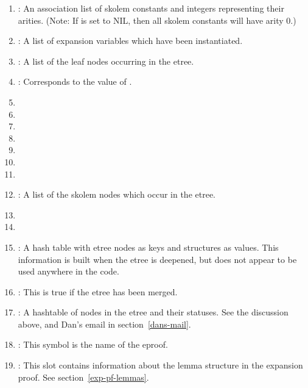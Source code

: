 \begin{enumerate}
\item {}:  An association list of skolem constants and integers representing their arities.
(Note: If  is set to NIL, then all skolem constants will have arity 0.)

\item {}:  A list of expansion variables which have been instantiated.

\item {}:  A list of the leaf nodes occurring in the etree.

\item {}:  Corresponds to the value of .

\item {}

\item {}

\item {}

\item {}

\item {}

\item {}

\item {}

\item {}:  A list of the skolem nodes which occur in the etree.

\item {}

\item {}

\item {}:  A hash table with etree nodes as keys
and  structures as values.  This information
is built when the etree is deepened, but does not appear to be used
anywhere in the code.

\item {}:  This is true if the etree has been merged.

\item {}:  A hashtable of nodes in the etree and their statuses.
See the discussion above, and Dan's email in section~\ref{dans-mail}.

\item {}:  This symbol is the name of the eproof.

\item {}:  This slot contains information
about the lemma structure in the expansion proof.
See section~\ref{exp-pf-lemmas}.
\end{enumerate}

